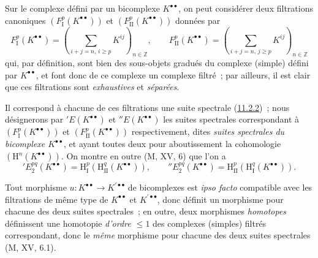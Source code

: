 \begin{env}[11.3.2]
\label{0.11.3.2-fr}
Sur le complexe défini par un bicomplexe $K^{\bullet\bullet}$, on peut
considérer deux filtrations canoniques
$(F_{\mathrm I}^p(K^{\bullet\bullet}))$ et
$(F_{\mathrm{II}}^p(K^{\bullet\bullet}))$ données par
\[
\label{0.11.3.2.1-fr}
  F_{\mathrm I}^p(K^{\bullet\bullet})
  =\left(\sum_{i+j=n,\,i\geq p}K^{ij}\right)_{n\in\mathbb Z},
  \qquad
  F_{\mathrm{II}}^p(K^{\bullet\bullet})
  =\left(\sum_{i+j=n,\,j\geq p}K^{ij}\right)_{n\in\mathbb Z}
  \tag{11.3.2.1}
\]
qui, par définition, sont bien des sous-objets gradués du complexe (simple)
défini par $K^{\bullet\bullet}$, et font donc de ce complexe un complexe
filtré~; par ailleurs, il est clair que ces filtrations sont \emph{exhaustives} et
\emph{séparées}.

Il correspond à chacune de ces filtrations une suite spectrale
(\hyperref[0.11.2.2-fr]{11.2.2})~; nous désignerons par
$'E(K^{\bullet\bullet})$ et $''E(K^{\bullet\bullet})$ les suites spectrales
correspondant à $(F_{\mathrm I}^p(K^{\bullet\bullet}))$ et
$(F_{\mathrm{II}}^p(K^{\bullet\bullet}))$ respectivement, dites
\emph{suites spectrales du bicomplexe $K^{\bullet\bullet}$}, et ayant toutes
deux pour aboutissement la cohomologie
$(\mathrm H^n(K^{\bullet\bullet}))$. On montre en outre (M, XV, 6) que l'on a
\[
\label{0.11.3.2.2-fr}
  'E_2^{pq}(K^{\bullet\bullet})
  =\mathrm H_{\mathrm I}^p(\mathrm H_{\mathrm{II}}^q(K^{\bullet\bullet})),
  \qquad
  ''E_2^{pq}(K^{\bullet\bullet})
  =\mathrm H_{\mathrm{II}}^p(\mathrm H_{\mathrm I}^q(K^{\bullet\bullet})).
  \tag{11.3.2.2}
\]

Tout morphisme $u:K^{\bullet\bullet}\to K^{\prime\bullet\bullet}$ de
bicomplexes est \emph{ipso facto} compatible avec les filtrations de même
type de $K^{\bullet\bullet}$ et $K^{\prime\bullet\bullet}$, donc définit un
morphisme pour chacune des deux suites spectrales~; en outre, deux morphismes
\emph{homotopes} définissent une homotopie \emph{d'ordre $\leq1$} des
complexes (simples) filtrés correspondant, donc le \emph{même} morphisme pour
chacune des deux suites spectrales (M, XV, 6.1).
\end{env}

